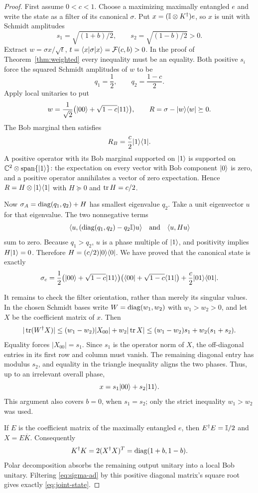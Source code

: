 \begin{proof}
First assume $0<c<1$. Choose a maximizing maximally entangled $e$ and write the state as a filter of its canonical $\sigma$. Put $x=(\mathbb I\otimes K^\dagger)e$, so $x$ is unit with Schmidt amplitudes
\[
 s_1=\sqrt{(1+b)/2},\qquad s_2=\sqrt{(1-b)/2}>0.
\]
Extract $w=\sigma x/\sqrt{t}$, $t=\langle x\rvert\sigma\lvert x\rangle=\mathcal F(c,b)>0$. In the proof of Theorem~\ref{thm:weighted} every inequality must be an equality. Both positive $s_i$ force the squared Schmidt amplitudes of $w$ to be
\[
 q_1=\frac12,\qquad q_2=\frac{1-c}{2}.
\]
Apply local unitaries to put
\[
 w=\frac1{\sqrt2}\bigl(\lvert 00\rangle+\sqrt{1-c}\lvert 11\rangle\bigr),\qquad
 R=\sigma-\lvert w\rangle\langle w\rvert\succeq0.
\]
The Bob marginal then satisfies
\[
 R_B=\frac c2\lvert 1\rangle\langle 1\rvert.
\]
A positive operator with its Bob marginal supported on $\lvert 1\rangle$ is supported on $\mathbb C^2\otimes\mathrm{span}\{\lvert 1\rangle\}$: the expectation on every vector with Bob component $\lvert 0\rangle$ is zero, and a positive operator annihilates a vector of zero expectation. Hence $R=H\otimes\lvert 1\rangle\langle 1\rvert$ with $H\succeq0$ and $\operatorname{tr} H=c/2$.

Now $\sigma_A=\operatorname{diag}(q_1,q_2)+H$ has smallest eigenvalue $q_2$. Take a unit eigenvector $u$ for that eigenvalue. The two nonnegative terms
\[
 \langle u,(\operatorname{diag}(q_1,q_2)-q_2\mathbb I)u\rangle\quad\text{and}\quad\langle u,Hu\rangle
\]
sum to zero. Because $q_1>q_2$, $u$ is a phase multiple of $\lvert 1\rangle$, and positivity implies $H\lvert 1\rangle=0$. Therefore $H=(c/2)\lvert 0\rangle\langle 0\rvert$. We have proved that the canonical state is exactly
\begin{equation}\label{eq:sigma-ad}
 \sigma_c=\frac12\bigl(\lvert 00\rangle+\sqrt{1-c}\lvert 11\rangle\bigr)
                    \bigl(\langle 00\rvert+\sqrt{1-c}\langle 11\rvert\bigr)
            +\frac c2\lvert 01\rangle\langle 01\rvert.
\end{equation}

It remains to check the filter orientation, rather than merely its singular values. In the chosen Schmidt bases write $W=\operatorname{diag}(w_1,w_2)$ with $w_1>w_2>0$, and let $X$ be the coefficient matrix of $x$. Then
\[
 |\operatorname{tr}(W^\dagger X)|
 \le(w_1-w_2)|X_{00}|+w_2|\operatorname{tr} X|
 \le(w_1-w_2)s_1+w_2(s_1+s_2).
\]
Equality forces $|X_{00}|=s_1$. Since $s_1$ is the operator norm of $X$, the off-diagonal entries in its first row and column must vanish. The remaining diagonal entry has modulus $s_2$, and equality in the triangle inequality aligns the two phases. Thus, up to an irrelevant overall phase,
\[
 x=s_1\lvert 00\rangle+s_2\lvert 11\rangle.
\]
This argument also covers $b=0$, when $s_1=s_2$; only the strict inequality $w_1>w_2$ was used.

If $E$ is the coefficient matrix of the maximally entangled $e$, then $E^\dagger E=\mathbb I/2$ and $X=E\overline K$. Consequently
\[
 K^\dagger K=2(X^\dagger X)^T=\operatorname{diag}(1+b,1-b).
\]
Polar decomposition absorbs the remaining output unitary into a local Bob unitary. Filtering \eqref{eq:sigma-ad} by this positive diagonal matrix's square root gives exactly \eqref{eq:joint-state}.


\end{proof}
